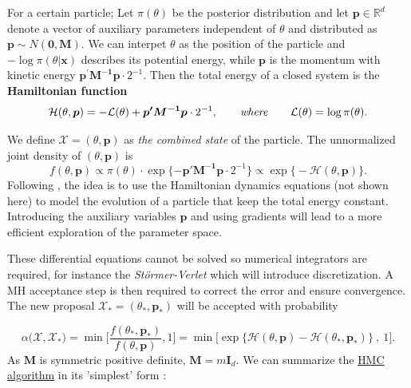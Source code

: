 \begin{definition}
	For a certain particle; Let $\pi(\theta)$ be the posterior distribution and let $\boldsymbol{p}\in\mathbb{R}^d$ denote a vector of auxiliary parameters independent of $\theta$ and distributed as $\boldsymbol{p}\sim N(\boldsymbol{0},\boldsymbol{M})$. We can interpet $\theta$ as the position of the particle and $-\log\pi(\theta|\boldsymbol{x})$ describes its potential energy, while $\boldsymbol{p}$ is the momentum with kinetic energy $\boldsymbol{p^{'}M^{-1}p}\cdot2^{-1}$. Then the total energy of a closed system is the \textbf{Hamiltonian function }
	\begin{equation}
	\mathcal{H}(\theta,\boldsymbol{p})=-\mathcal{L}(\theta)+\boldsymbol{p'M^{-1}p}\cdot 2^{-1}, \qquad\text{\emph{where}}\qquad \mathcal{L}(\theta)=\log\pi(\theta).
	\end{equation}
\end{definition}
We define $\mathcal{X} = (\theta, \boldsymbol{p})$ as \emph{the combined state} of the particle.
The unnormalized joint density of $(\theta,\boldsymbol{p})$ is 
\begin{equation}
f(\theta,\boldsymbol{p})\propto \pi(\theta)\cdot\exp\{-\boldsymbol{p'M^{-1}p}\cdot 2^{-1}\}\propto\exp\big\{-\mathcal{H}(\theta,\boldsymbol{p})\big\}.
\end{equation}
Following \cite{hartmann_bayesian_2016}, the idea is to use the Hamiltonian dynamics equations (not shown here) to model the evolution of a particle that keep the total energy constant.
Introducing the auxiliary variables $\boldsymbol{p}$ and using gradients will lead to a more efficient exploration of the parameter space.

These differential equations cannot be solved so numerical integrators are required, for instance the \emph{Störmer-Verlet} which will introduce discretization. A MH acceptance step is then required to correct the error and ensure convergence.  The new proposal $\mathcal{X}_*=(\theta_*,\boldsymbol{p}_*)$ will be accepted with probability 

\begin{equation}
\alpha\big(\mathcal{X},\mathcal{X}_*\big)=\min\Bigg[\frac{f(\theta_*,\boldsymbol{p}_*)}{f(\theta,\boldsymbol{p})},1\Bigg]=\min\Big[\exp\big\{\mathcal{H}(\theta,\boldsymbol{p})-\mathcal{H}(\theta_*,\boldsymbol{p}_*)\big\}\ ,\ 1\Big].
\end{equation}
As $\boldsymbol{M}$ is symmetric positive definite, $\boldsymbol{M}=m\boldsymbol{I}_d$. 
We can summarize the \hyperref[algo_hmc]{HMC algorithm} in its 'simplest' form :

